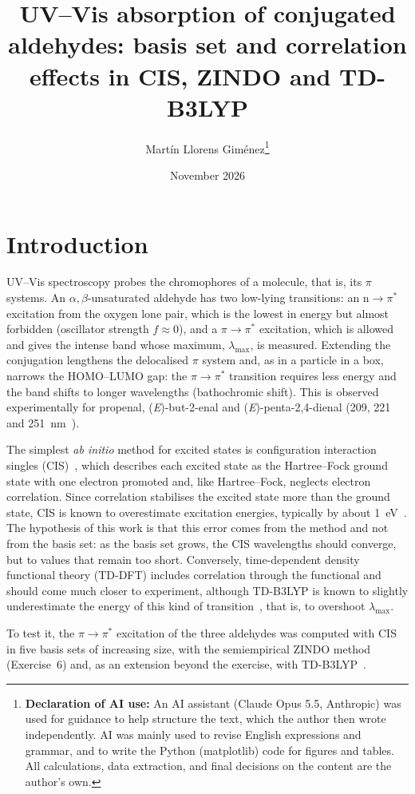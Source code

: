 \documentclass[10pt,a4paper]{article}
\title{UV--Vis absorption of conjugated aldehydes: basis set and
correlation effects in CIS, ZINDO and TD-B3LYP}
\author{Martín Llorens Giménez\thanks{\textbf{Declaration of AI use:} An AI assistant (Claude Opus 5.5, Anthropic) was used for guidance to help structure the text, which the author then wrote independently. AI was mainly used to revise English expressions and grammar, and to write the Python (matplotlib) code for figures and tables. All calculations, data extraction, and final decisions on the content are the author's own.}}
\date{November 2026}
\begin{document}
\maketitle

\section{Introduction} %


UV--Vis spectroscopy probes the chromophores of a molecule, that is, its
$\pi$ systems. An $\alpha,\beta$-unsaturated aldehyde has two low-lying
transitions: an n$\rightarrow\pi^*$ excitation from the oxygen lone pair,
which is the lowest in energy but almost forbidden (oscillator strength
$f \approx 0$), and a $\pi\rightarrow\pi^*$ excitation, which is allowed
and gives the intense band whose maximum, $\lambda_\mathrm{max}$, is
measured. Extending the conjugation lengthens the delocalised $\pi$ system
and, as in a particle in a box, narrows the HOMO--LUMO gap: the
$\pi\rightarrow\pi^*$ transition requires less energy and the band shifts
to longer wavelengths (bathochromic shift). This is observed experimentally
for propenal, (\textit{E})-but-2-enal and (\textit{E})-penta-2,4-dienal
(209, 221 and 251~nm~\cite{guion56}).

The simplest \textit{ab initio} method for excited states is configuration
interaction singles (CIS)~\cite{Foresman1992}, which describes each excited
state as the Hartree--Fock ground state with one electron promoted and,
like Hartree--Fock, neglects electron correlation. Since correlation
stabilises the excited state more than the ground state, CIS is known to
overestimate excitation energies, typically by about 1~eV~\cite{Dreuw2005}.
The hypothesis of this work is that this error comes from the method and
not from the basis set: as the basis set grows, the CIS wavelengths should
converge, but to values that remain too short. Conversely,
time-dependent density functional theory (TD-DFT) includes correlation
through the functional and should come much closer to experiment, although
TD-B3LYP is known to slightly underestimate the energy of this kind of
transition~\cite{Loos2020}, that is, to overshoot $\lambda_\mathrm{max}$.

To test it, the $\pi\rightarrow\pi^*$ excitation of the three aldehydes
was computed with CIS in five basis sets of increasing size, with the
semiempirical ZINDO method~\cite{Ridley1973} (Exercise~6) and, as an
extension beyond the exercise, with TD-B3LYP~\cite{Becke1993,Lee1988}.
\end{document}
